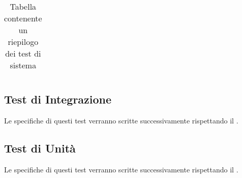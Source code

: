 \begin{center}
\begin{longtable}{|c|p{10cm}|c|}
			 \caption{Tabella contenente un riepilogo dei test di sistema}
			\end{longtable}
		\end{center}


	\subsection{Test di Integrazione}
		Le specifiche di questi test verranno scritte successivamente rispettando il . 

	\subsection{Test di Unità}
	 	Le specifiche di questi test verranno scritte successivamente rispettando il . 
